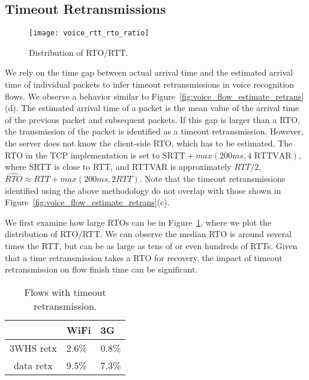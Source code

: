 \subsection{Timeout Retransmissions}\label{sec:v_rto}

\begin{figure}[th]
\centering
	\texttt{[image: voice\_rtt\_rto\_ratio]}
\caption{Distribution of RTO/RTT.}
\label{fig:rto_rtt}
\end{figure}

We rely on the time gap between actual arrival time and the estimated arrival time of individual packets to infer timeout retransmissions in voice recognition flows. We observe a behavior similar to Figure~\ref{fig:voice_flow_estimate_retrans}(d). The estimated arrival time of a packet is the mean value of the arrival time of the previous packet and subsequent packets. If this gap is larger than a RTO, the transmission of the packet is identified as a timeout retransmission. However, the server does not know the client-side RTO, which has to be estimated. The RTO in the TCP implementation is set to $\text{SRTT} + max(200ms, 4 \text{ RTTVAR})$\cite{rfc62982011computing}, where SRTT is close to RTT, and RTTVAR is approximately $RTT/2$, \ie $\widehat{RTO} \approx RTT + max(200ms, 2 RTT)$. Note that the timeout retransmissions identified using the above methodology do not overlap with those shown in Figure~\ref{fig:voice_flow_estimate_retrans}(c).

We first examine how large RTOs can be in Figure~\ref{fig:rto_rtt}, where we plot the distribution of RTO/RTT. We can observe the median RTO is around several times the RTT, but can be as large as tens of or even hundreds of RTTs. Given that a time retransmission takes a RTO for recovery, the impact of timeout retransmission on flow finish time can be significant.

\begin{table}[th]
\centering
\renewcommand{\arraystretch}{1.1}
\caption{Flows with timeout retransmission.}
\label{tab:voice_timeout_stats}
\begin{tabular}{c | C{2cm} | C{2cm}}
	\hline
	 & WiFi & 3G \\
	\hline
	3WHS retx & 2.6\% & 0.8\% \\
	data retx & 9.5\%  & 7.3\% \\
	\hline
\end{tabular}
\end{table}

